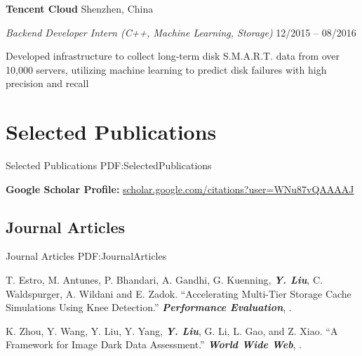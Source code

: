 \documentclass[a4paper,10pt,oneside]{article}
\begin{document}
\begin{body}
\GapNoBreak
{\textbf{Tencent Cloud}} 
\hfill
Shenzhen, China

\emph{Backend Developer Intern (C++, Machine Learning, Storage)}
\hfill
12/2015 --
08/2016

\GapNoBreak
\BulletItem
Developed infrastructure to collect long-term disk S.M.A.R.T. data from over 10,000 servers, utilizing machine learning to predict disk failures with high precision and recall 



\section
{Selected Publications}
{Selected Publications}
{PDF:SelectedPublications}


\textbf{Google Scholar Profile:} \href{https://scholar.google.com/citations?user=WNu87vQAAAAJ}{scholar.google.com/citations?user=WNu87vQAAAAJ}

\subsection
{Journal Articles}
{Journal Articles}
{PDF:JournalArticles}

\NumberedItem{[1]}
T. Estro, M. Antunes, P. Bhandari, A. Gandhi, G. Kuenning, \textbf{\textit{Y. Liu}}, C. Waldspurger, A. Wildani and E. Zadok.
``Accelerating Multi-Tier Storage Cache Simulations Using Knee Detection.'' 
\textit{\textbf{Performance Evaluation}},
.


\NumberedItem{[2]}
K. Zhou, Y. Wang, Y. Liu, Y. Yang, \textbf{\textit{Y. Liu}}, G. Li, L. Gao, and Z. Xiao.
``A Framework for Image Dark Data Assessment.'' 
\textit{\textbf{World Wide Web}},
.



\end{body}
\end{document}
